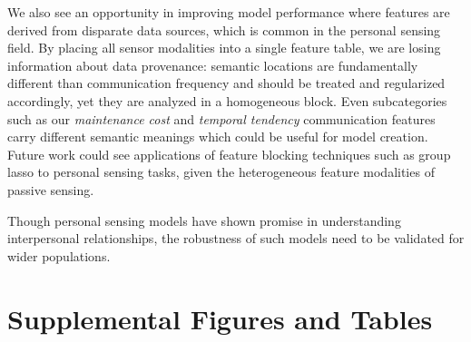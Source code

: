 \documentclass[acmlarge]{acmart}
\begin{document}
We also see an opportunity in improving model performance where features are derived from disparate data sources, which is common in the personal sensing field. By placing all sensor modalities into a single feature table, we are losing information about data provenance: semantic locations are fundamentally different than communication frequency and should be treated and regularized accordingly, yet they are analyzed in a homogeneous block. Even subcategories such as our \textit{maintenance cost} and \textit{temporal tendency} communication features carry different semantic meanings which could be useful for model creation. Future work could see applications of feature blocking techniques such as group lasso to personal sensing tasks, given the heterogeneous feature modalities of passive sensing.

Though personal sensing models have shown promise in understanding interpersonal relationships, the robustness of such models need to be validated for wider populations.

\pagebreak
\appendix

\renewcommand\thefigure{\thesection.\arabic{table}}    
\setcounter{table}{0}

\renewcommand\thefigure{\thesection.\arabic{figure}}    
\setcounter{figure}{0}

\section{Supplemental Figures and Tables}
\end{document}
